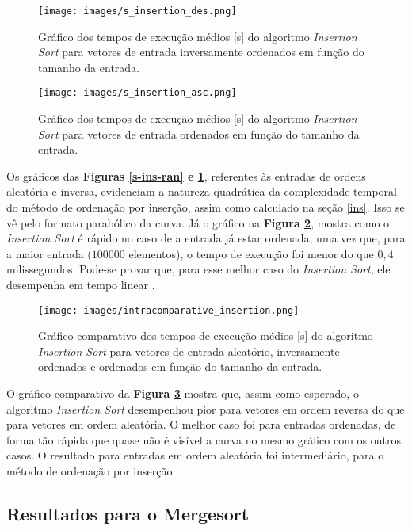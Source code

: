 \documentclass[fontsize=10pt]{article}
\begin{document}
\begin{figure}[H]
\centering
\texttt{[image: images/s\_insertion\_des.png]}
\caption{Gráfico dos tempos de execução médios [s] do algoritmo \textit{Insertion Sort} para vetores de entrada inversamente ordenados em função do tamanho da entrada.}
\label{s-ins-des}
\end{figure}

\begin{figure}[H]
\centering
\texttt{[image: images/s\_insertion\_asc.png]}
\caption{Gráfico dos tempos de execução médios [s] do algoritmo \textit{Insertion Sort} para vetores de entrada ordenados em função do tamanho da entrada.}
\label{s-ins-asc}
\end{figure}

Os gráficos das \textbf{Figuras \ref{s-ins-ran} e \ref{s-ins-des}}, referentes às entradas de ordens aleatória e inversa, evidenciam a natureza quadrática da complexidade temporal do método de ordenação por inserção, assim como calculado na seção \ref{ins}. Isso se vê pelo formato parabólico da curva. Já o gráfico na \textbf{Figura \ref{s-ins-asc}}, mostra como o \textit{Insertion Sort} é rápido no caso de a entrada já estar ordenada, uma vez que, para a maior entrada ($100000$ elementos), o tempo de execução foi menor do que $0,4$ milissegundos. Pode-se provar que, para esse melhor caso do \textit{Insertion Sort}, ele desempenha em tempo linear \cite{cormen}.

\begin{figure}[H]
\centering
\texttt{[image: images/intracomparative\_insertion.png]}
\caption{Gráfico comparativo dos tempos de execução médios [s] do algoritmo \textit{Insertion Sort} para vetores de entrada aleatório, inversamente ordenados e ordenados em função do tamanho da entrada.}
\label{intracomp-ins}
\end{figure}

O gráfico comparativo da \textbf{Figura \ref{intracomp-ins}} mostra que, assim como esperado, o algoritmo \textit{Insertion Sort} desempenhou pior para vetores em ordem reversa do que para vetores em ordem aleatória. O melhor caso foi para entradas ordenadas, de forma tão rápida que quase não é visível a curva no mesmo gráfico com os outros casos. O resultado para entradas em ordem aleatória foi intermediário, para o método de ordenação por inserção.
 
\subsection{Resultados para o Mergesort}
\end{document}
